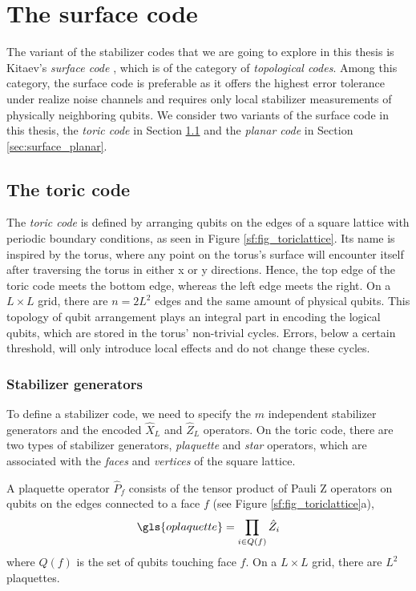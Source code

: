 \chapter{The surface code}\label{ch:surfacecode}

The variant of the stabilizer codes that we are going to explore in this thesis is Kitaev's \emph{surface code} \cite{kitaev2003fault}, which is of the category of \emph{topological codes}. Among this category, the surface code is preferable as it offers the highest error tolerance under realize noise channels and requires only local stabilizer measurements of physically neighboring qubits. We consider two variants of the surface code in this thesis, the \emph{toric code} in Section \ref{sec:surface_toric} and the \emph{planar code} in Section \ref{sec:surface_planar}.


\section{The toric code}\label{sec:surface_toric}
The \emph{toric code} is defined by arranging qubits on the edges of a square lattice with periodic boundary conditions, as seen in Figure \ref{sf:fig_toriclattice}. Its name is inspired by the torus, where any point on the torus's surface will encounter itself after traversing the torus in either x or y directions. Hence, the top edge of the toric code meets the bottom edge, whereas the left edge meets the right. On a $L\times L$ grid, there are $n = 2L^2$ edges and the same amount of physical qubits. This topology of qubit arrangement plays an integral part in encoding the logical qubits, which are stored in the torus' non-trivial cycles. Errors, below a certain threshold, will only introduce local effects and do not change these cycles.

\subsection{Stabilizer generators}

To define a stabilizer code, we need to specify the $m$ independent stabilizer generators and the encoded $\hat{X}_L$ and $\hat{Z}_L$ operators. On the toric code, there are two types of stabilizer generators, \emph{plaquette} and \emph{star} operators, which are associated with the \emph{faces} and \emph{vertices} of the square lattice.


\begin{definition}
  A plaquette operator $\hat{P}_f$ consists of the tensor product of Pauli Z operators on qubits on the edges connected to a face $f$ (see Figure \ref{sf:fig_toriclattice}a),
  \begin{equation}\label{eq:sf_plaquette}
    \gls{oplaquette} = \prod_{i\in Q(f)} \hat{Z}_i
  \end{equation}
  where $Q(f)$ is the set of qubits touching face $f$. On a $L\times L$ grid, there are $L^2$ plaquettes.
\end{definition}


